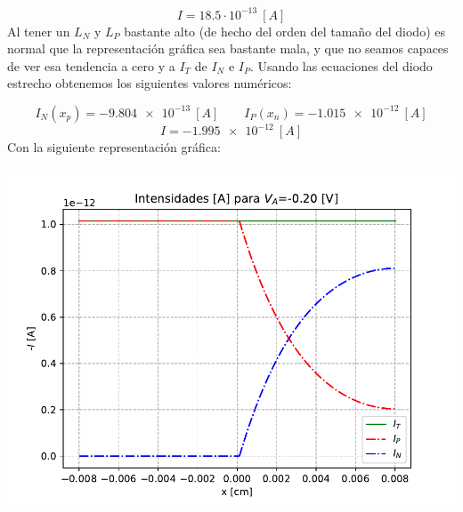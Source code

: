 \begin{enumerate}[label=\alph*)]
    \begin{equation}
        I =  18.5 \cdot 10^{-13} \ [\unit{A}]
    \end{equation}
    Al tener un $L_N$ y $L_P$ bastante alto (de hecho del orden del tamaño del diodo) es normal que la representación gráfica sea bastante mala, y que no seamos capaces de ver esa tendencia a cero y a $I_T$ de $I_N$ e $I_P$. Usando las ecuaciones del diodo estrecho obtenemos los siguientes valores numéricos: 

    \begin{equation}
        I_N(x_p)=\SI{-9.804e-13}{[A]} \qquad  
        I_P(x_n)=\SI{-1.015e-12}{[A]} 
    \end{equation}
    \begin{equation}
        I = \SI{-1.995e-12}{[A]}
    \end{equation}
    Con la siguiente representación gráfica:
    \begin{center}
    \includegraphics[width=0.6\linewidth]{Ejercicios/Ch_03/03_07_I.pdf}
    \end{center}

\end{enumerate}    

